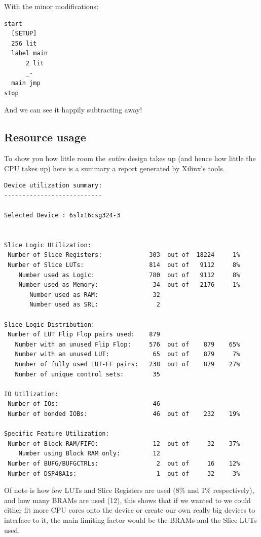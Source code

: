 \documentclass	[a4paper, 10pt]	{article}
\begin{document}
    With the minor modifications:
\begin{verbatim}
start
  [SETUP]
  256 lit
  label main
      2 lit
      _-
  main jmp
stop 
\end{verbatim}

    And we can see it happily subtracting away!

    \subsection{Resource usage}

    To show you how little room the \emph{entire} design takes up (and hence how little the
    CPU takes up) here is a summary a report generated by Xilinx's tools.

\begin{verbatim}
Device utilization summary:
---------------------------

Selected Device : 6slx16csg324-3 


Slice Logic Utilization: 
 Number of Slice Registers:             303  out of  18224     1%  
 Number of Slice LUTs:                  814  out of   9112     8%  
    Number used as Logic:               780  out of   9112     8%  
    Number used as Memory:               34  out of   2176     1%  
       Number used as RAM:               32
       Number used as SRL:                2

Slice Logic Distribution: 
 Number of LUT Flip Flop pairs used:    879
   Number with an unused Flip Flop:     576  out of    879    65%  
   Number with an unused LUT:            65  out of    879     7%  
   Number of fully used LUT-FF pairs:   238  out of    879    27%  
   Number of unique control sets:        35

IO Utilization: 
 Number of IOs:                          46
 Number of bonded IOBs:                  46  out of    232    19%  

Specific Feature Utilization:
 Number of Block RAM/FIFO:               12  out of     32    37%  
    Number using Block RAM only:         12
 Number of BUFG/BUFGCTRLs:                2  out of     16    12%  
 Number of DSP48A1s:                      1  out of     32     3%  
\end{verbatim}

  Of note is how few LUTs and Slice Registers are used (8\% and 1\% respectively), and how
  many BRAMs are used (12), this shows that if we wanted to we could either fit more CPU cores
  onto the device or create our own really big devices to interface to it, the main limiting factor would be the BRAMs and
  the Slice LUTs used.
\end{document}
